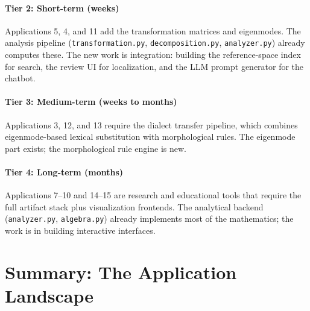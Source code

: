 \documentclass[11pt,a4paper]{article}
\begin{document}
\subsection{Tier 2: Short-term (weeks)}

Applications 5, 4, and 11 add the transformation matrices and
eigenmodes. The analysis pipeline (\texttt{transformation.py},
\texttt{decomposition.py}, \texttt{analyzer.py}) already computes
these. The new work is integration: building the reference-space
index for search, the review UI for localization, and the LLM prompt
generator for the chatbot.

\subsection{Tier 3: Medium-term (weeks to months)}

Applications 3, 12, and 13 require the dialect transfer pipeline,
which combines eigenmode-based lexical substitution with
morphological rules. The eigenmode part exists; the morphological
rule engine is new.

\subsection{Tier 4: Long-term (months)}

Applications 7--10 and 14--15 are research and educational tools
that require the full artifact stack plus visualization frontends.
The analytical backend (\texttt{analyzer.py}, \texttt{algebra.py})
already implements most of the mathematics; the work is in building
interactive interfaces.

\newpage
\part*{Summary: The Application Landscape}
\end{document}
